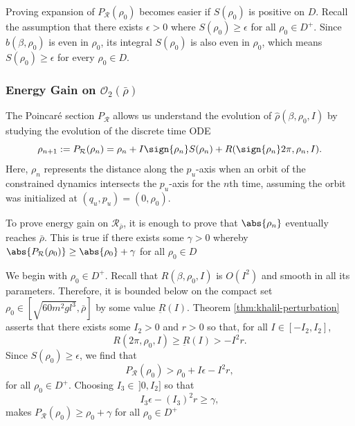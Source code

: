 Proving expansion of \(P_\mathcal{R}(\rho_0)\) becomes easier if
\(S(\rho_0)\) is positive on \(D\).
Recall the assumption that there exists
\(\epsilon > 0\) where \(S(\rho_0) \geq \epsilon\) for all 
\(\rho_0 \in D^+\).
Since \(b(\beta,\rho_0)\) is even in \(\rho_0\),
its integral \(S(\rho_0)\) is also even in \(\rho_0\),
which means \(S(\rho_0) \geq \epsilon\) for every \(\rho_0 \in D\).

\subsubsection*{Energy Gain on \(\mathcal{O}_2(\bar{\rho})\)}
The Poincar\'{e} section \(P_\mathcal{R}\) allows us understand the evolution of
\(\hat{\rho}(\beta,\rho_0,I)\) by studying the evolution of the discrete time
ODE
\begin{equation}\label{eqn:rhohat-discrete}
    \rho_{n+1} := P_\mathcal{R}(\rho_n) 
    = \rho_n + I\sign{\rho_n}S(\rho_n) + 
        R(\sign{\rho_n}2\pi,\rho_n,I)
    .
\end{equation}
Here, \(\rho_n\) represents the distance along the
\(p_u\)-axis when an orbit of the constrained dynamics intersects the
\(p_u\)-axis for the \(n\)th time, assuming the orbit was initialized at
\((q_u,p_u) = (0,\rho_0)\).

To prove energy gain on \(\mathcal{R}_{\bar{\rho}}\), it is
enough to prove that \(\abs{\rho_n}\) eventually reaches \(\bar{\rho}\).
This is true if there exists some \(\gamma > 0\)
whereby \(\abs{P_\mathcal{R}(\rho_0)} \geq \abs{\rho_0} + \gamma\) for all 
\(\rho_0 \in D\)

We begin with \(\rho_0 \in D^+\).
Recall that \(R(\beta,\rho_0,I)\) is \(O(I^2)\) and smooth in all
its parameters.
Therefore, it is bounded below on the compact set
\(\rho_0 \in \left[\sqrt{60m^2gl^3},\bar{\rho}\right]\) by some value
\(\underbar{R}(I)\).
Theorem \ref{thm:khalil-perturbation} asserts that there exists some 
\(I_2 > 0\) and \(r > 0\) so that, for all \(I \in [-I_2,I_2]\),
\[
    R(2\pi,\rho_0,I) \geq \underbar{R}(I) > -I^2r
    .
\]
Since \(S(\rho_0) \geq \epsilon\), we find that
\[
    P_\mathcal{R}(\rho_0) > \rho_0 + I\epsilon -I^2r
    ,
\]
for all \(\rho_0 \in D^+\).
Choosing \(I_3 \in \,]0,I_2]\) so that
\[
    I_3\epsilon - (I_3)^2 r \geq \gamma
    ,
\] 
makes \(P_\mathcal{R}(\rho_0) \geq \rho_0 + \gamma\) for all 
\(\rho_0 \in D^+\)

